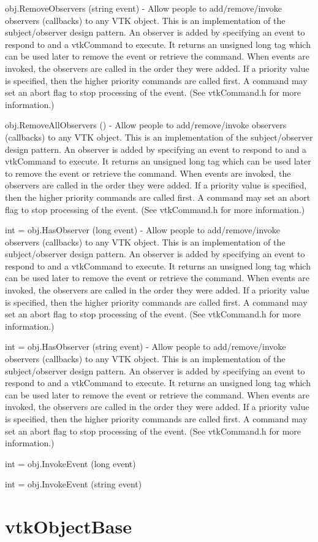 \begin{DoxyItemize}
\item {\ttfamily obj.\-Remove\-Observers (string event)} -\/ Allow people to add/remove/invoke observers (callbacks) to any V\-T\-K object. This is an implementation of the subject/observer design pattern. An observer is added by specifying an event to respond to and a vtk\-Command to execute. It returns an unsigned long tag which can be used later to remove the event or retrieve the command. When events are invoked, the observers are called in the order they were added. If a priority value is specified, then the higher priority commands are called first. A command may set an abort flag to stop processing of the event. (See vtk\-Command.\-h for more information.)  
\item {\ttfamily obj.\-Remove\-All\-Observers ()} -\/ Allow people to add/remove/invoke observers (callbacks) to any V\-T\-K object. This is an implementation of the subject/observer design pattern. An observer is added by specifying an event to respond to and a vtk\-Command to execute. It returns an unsigned long tag which can be used later to remove the event or retrieve the command. When events are invoked, the observers are called in the order they were added. If a priority value is specified, then the higher priority commands are called first. A command may set an abort flag to stop processing of the event. (See vtk\-Command.\-h for more information.)  
\item {\ttfamily int = obj.\-Has\-Observer (long event)} -\/ Allow people to add/remove/invoke observers (callbacks) to any V\-T\-K object. This is an implementation of the subject/observer design pattern. An observer is added by specifying an event to respond to and a vtk\-Command to execute. It returns an unsigned long tag which can be used later to remove the event or retrieve the command. When events are invoked, the observers are called in the order they were added. If a priority value is specified, then the higher priority commands are called first. A command may set an abort flag to stop processing of the event. (See vtk\-Command.\-h for more information.)  
\item {\ttfamily int = obj.\-Has\-Observer (string event)} -\/ Allow people to add/remove/invoke observers (callbacks) to any V\-T\-K object. This is an implementation of the subject/observer design pattern. An observer is added by specifying an event to respond to and a vtk\-Command to execute. It returns an unsigned long tag which can be used later to remove the event or retrieve the command. When events are invoked, the observers are called in the order they were added. If a priority value is specified, then the higher priority commands are called first. A command may set an abort flag to stop processing of the event. (See vtk\-Command.\-h for more information.)  
\item {\ttfamily int = obj.\-Invoke\-Event (long event)}  
\item {\ttfamily int = obj.\-Invoke\-Event (string event)}  
\end{DoxyItemize}\hypertarget{vtkcommon_vtkobjectbase}{}\section{vtk\-Object\-Base}\label{vtkcommon_vtkobjectbase}
